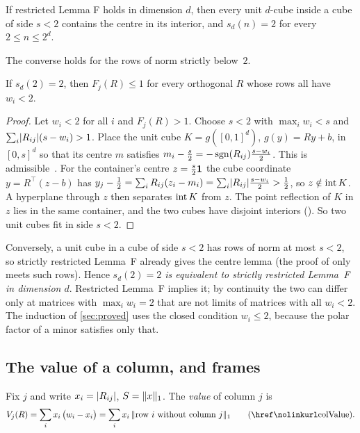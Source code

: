 \documentclass[11pt,a4paper]{article}
\newcommand{\status}[1]{\textsf{\small[#1]}}
\begin{document}
\begin{theorem}[Hosono; Paper~I \status{Lean}]\label{thm:FtoS}
If restricted Lemma F holds in dimension $d$, then every unit $d$-cube inside a cube of side $s<2$ contains the centre in its interior, and $s_d(n)=2$ for every $2\le n\le 2^d$.
\end{theorem}

The converse holds for the rows of norm strictly below~$2$.

\begin{proposition}[\status{proof}]\label{prop:converse}
If $s_d(2)=2$, then $F_j(R)\le 1$ for every orthogonal $R$ whose rows all have $w_i<2$.
\end{proposition}
\begin{proof}
Let $w_i<2$ for all $i$ and $F_j(R)>1$. Choose $s<2$ with $\max_iw_i<s$ and $\sum_i\lvert R_{ij}\rvert(s-w_i)>1$. Place the unit cube $K=g([0,1]^d)$, $g(y)=Ry+b$, in $[0,s]^d$ so that its centre $m$ satisfies $m_i-\frac s2=-\operatorname{sgn}(R_{ij})\frac{s-w_i}2$. This is admissible~\cite[\S3]{cubecentre}. For the container's centre $z=\frac s2\mathbf 1$ the cube coordinate $y=R^\top(z-b)$ has $y_j-\frac12=\sum_iR_{ij}(z_i-m_i)=\sum_i\lvert R_{ij}\rvert\frac{s-w_i}2>\frac12$, so $z\notin\operatorname{int} K$. A hyperplane through $z$ then separates $\operatorname{int} K$ from $z$. The point reflection of $K$ in $z$ lies in the same container, and the two cubes have disjoint interiors (). So two unit cubes fit in side $s<2$.
\end{proof}

Conversely, a unit cube in a cube of side $s<2$ has rows of norm at most $s<2$, so strictly restricted Lemma~F already gives the centre lemma (the proof of  only meets such rows). Hence \emph{$s_d(2)=2$ is equivalent to strictly restricted Lemma~F in dimension $d$}. Restricted Lemma~F implies it; by continuity the two can differ only at matrices with $\max_iw_i=2$ that are not limits of matrices with all $w_i<2$. The induction of \cref{sec:proved} uses the closed condition $w_i\le2$, because the polar factor of a minor satisfies only that.

\subsection{The value of a column, and frames}
Fix $j$ and write $x_i=\lvert R_{ij}\rvert$, $S=\lVert x\rVert_1$. The \emph{value} of column $j$ is
\[
V_j(R)=\sum_i x_i\,\bigl(w_i-x_i\bigr)=\sum_i x_i\,\norm{\text{row $i$ without column $j$}}_1
\qquad\text{(\lean{FacetStep}{colValue})}.
\]
\end{document}
